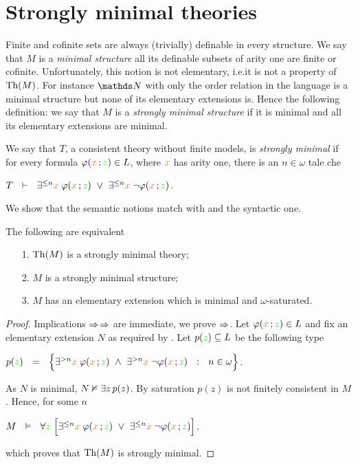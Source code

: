 \section{Strongly minimal theories\label{tfm}}%
 
Finite and cofinite sets are always (trivially) definable in every structure. We say that $M$ is a \emph{minimal structure\/} all its definable subsets of arity one are finite or cofinite. Unfortunately, this notion is not elementary, i.e.\@ it is not a property of $\textrm{Th}(M)$. For instance $\NN$ with only the order relation in the language is a minimal structure but none of its elementary extensions is.  Hence the following definition: we say that $M$ is a \emph{strongly minimal structure\/} if it is minimal and all its elementary extensions are minimal.

We say that $T$, a consistent theory without finite models, is \emph{strongly minimal\/} if 
for every formula $\varphi({\color{brown} x}\,;{\color{green} z})\in L$, where ${\color{brown} x}$ has arity one, there is an  $n\in\omega$ tale che

\hfil$T\ \ \vdash\ \ \exists^{\le n}{\color{brown} x}\;\varphi({\color{brown} x}\,;{\color{green} z})\ \vee\ \exists^{\le n}{\color{brown} x}\;\neg\varphi({\color{brown} x}\,;{\color{green} z})$.

We show that the semantic notions match with and the syntactic one.


\begin{proposition}\label{prop_fmequivalenzadefinizioni}
The following are equivalent
\begin{itemize}
\item[1.] $\textrm{Th}(M)$ is a strongly minimal theory;
\item[2.] $M$ is a strongly minimal structure; 
\item[3.] $M$ has an elementary extension which is minimal and $\omega$-saturated.
\end{itemize}
\end{proposition}
\begin{proof}
Implications $\Rightarrow$$\Rightarrow$ are immediate, we prove $\Rightarrow$.  Let $\varphi({\color{brown} x}\,;{\color{green} z})\in L$ and fix an elementary extension $N$ as required by . Let $p({\color{green} z})\subseteq L$ be the following type

\hfil$p({\color{green} z})\ \ =\ \ \Big\{ \exists^{> n}{\color{brown} x}\;\varphi({\color{brown} x}\,;{\color{green} z})\ \wedge\ \exists^{> n}{\color{brown} x}\;\neg\varphi({\color{brown} x}\,;{\color{green} z}) \ \ :\ \ n\in\omega\Big\}$.

As $N$ is minimal, $N\nvDash \exists z\,p(z)$. By saturation $p(z)$ is not finitely consistent in $M$. Hence, for some $n$ 

\hfil$M\ \ \vDash\ \  \forall {\color{green}z}\ \Big[\exists^{\le n}{\color{brown} x}\;\varphi({\color{brown} x}\,;{\color{green} z})\ \vee\ \exists^{\le n}{\color{brown} x}\;\neg\varphi({\color{brown} x}\,;{\color{green} z})\Big]$.

which proves that $\textrm{Th}(M)$ is strongly minimal.
\end{proof}

